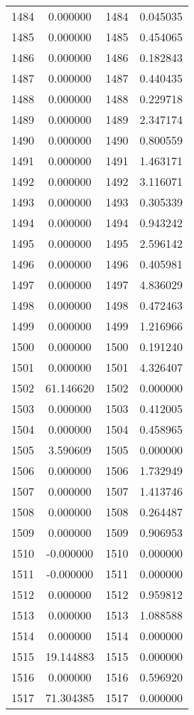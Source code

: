 \documentclass[12pt]{article}
\begin{document}
\begin{longtable}{@{}cccc@{}}
1484 & 0.000000 & 1484 & 0.045035 \\
1485 & 0.000000 & 1485 & 0.454065 \\
1486 & 0.000000 & 1486 & 0.182843 \\
1487 & 0.000000 & 1487 & 0.440435 \\
1488 & 0.000000 & 1488 & 0.229718 \\
1489 & 0.000000 & 1489 & 2.347174 \\
1490 & 0.000000 & 1490 & 0.800559 \\
1491 & 0.000000 & 1491 & 1.463171 \\
1492 & 0.000000 & 1492 & 3.116071 \\
1493 & 0.000000 & 1493 & 0.305339 \\
1494 & 0.000000 & 1494 & 0.943242 \\
1495 & 0.000000 & 1495 & 2.596142 \\
1496 & 0.000000 & 1496 & 0.405981 \\
1497 & 0.000000 & 1497 & 4.836029 \\
1498 & 0.000000 & 1498 & 0.472463 \\
1499 & 0.000000 & 1499 & 1.216966 \\
1500 & 0.000000 & 1500 & 0.191240 \\
1501 & 0.000000 & 1501 & 4.326407 \\
1502 & 61.146620 & 1502 & 0.000000 \\
1503 & 0.000000 & 1503 & 0.412005 \\
1504 & 0.000000 & 1504 & 0.458965 \\
1505 & 3.590609 & 1505 & 0.000000 \\
1506 & 0.000000 & 1506 & 1.732949 \\
1507 & 0.000000 & 1507 & 1.413746 \\
1508 & 0.000000 & 1508 & 0.264487 \\
1509 & 0.000000 & 1509 & 0.906953 \\
1510 & -0.000000 & 1510 & 0.000000 \\
1511 & -0.000000 & 1511 & 0.000000 \\
1512 & 0.000000 & 1512 & 0.959812 \\
1513 & 0.000000 & 1513 & 1.088588 \\
1514 & 0.000000 & 1514 & 0.000000 \\
1515 & 19.144883 & 1515 & 0.000000 \\
1516 & 0.000000 & 1516 & 0.596920 \\
1517 & 71.304385 & 1517 & 0.000000 \\

\end{longtable}
\end{document}
